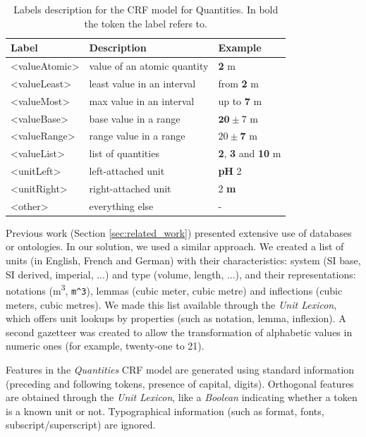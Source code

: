 \documentclass[sigconf]{acmart}
\begin{document}
\begin{table}[ht]
  \caption{Labels description for the CRF model for Quantities. In bold the token the label refers to.}
  \label{tab:quantities-model-labels}
  \begin{tabular}{lll}
    \toprule
    Label & Description & Example\\
    \midrule
    <valueAtomic> & value of an atomic quantity & \textbf{2} m \\
    <valueLeast> & least value in an interval & from \textbf{2} m \\
    <valueMost> & max value in an interval & up to \textbf{7} m \\
    <valueBase> & base value in a range & $\textbf{20}\pm7$ m \\
    <valueRange> & range value in a range & $20 \pm \textbf{7}$ m \\
    <valueList> & list of quantities & \textbf{2}, \textbf{3} and \textbf{10} m \\
    <unitLeft> & left-attached unit & \textbf{pH} 2 \\
    <unitRight> & right-attached unit & 2 \textbf{m} \\
    <other> & everything else & - \\
  \bottomrule
\end{tabular}
\end{table}

Previous work (Section \ref{sec:related_work}) presented extensive use of databases or ontologies. In our solution, we used a similar approach. We created a list of units (in English, French and German) with their characteristics: system (SI base, SI derived, imperial, ...) and type (volume, length, ...), and their representations: notations (m\textsuperscript{3}, \texttt{m\^{}3}), lemmas (cubic meter, cubic metre) and inflections (cubic meters, cubic metres). We made this list available through the \textit{Unit Lexicon}, which offers unit lookups by properties (such as notation, lemma, inflexion). A second gazetteer was created to allow the transformation of alphabetic values in numeric ones (for example, twenty-one to 21).

Features in the \textit{Quantities} CRF model are generated using standard information (preceding and following tokens, presence of capital, digits). Orthogonal features are obtained through the \textit{Unit Lexicon}, like a \textit{Boolean} indicating whether a token is a known unit or not. Typographical information (such as format, fonts, subscript/superscript) are ignored. 
\end{document}
